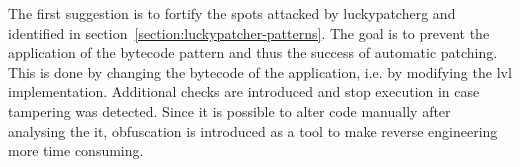 The first suggestion is to fortify the spots attacked by \gls{luckypatcherg} and identified in section~\ref{section:luckypatcher-patterns}.
The goal is to prevent the application of the bytecode pattern and thus the success of automatic patching.
This is done by changing the bytecode of the application, i.e. by modifying the \gls{lvl} implementation.
Additional checks are introduced and stop execution in case tampering was detected.
Since it is possible to alter code manually after analysing the it, obfuscation is introduced as a tool to make reverse engineering more time consuming.
